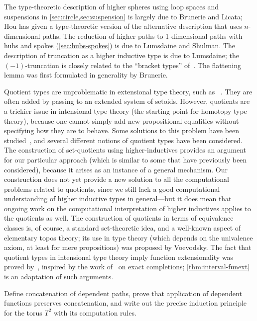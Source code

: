 The type-theoretic description of higher spheres using loop spaces and suspensions in \cref{sec:circle,sec:suspension} is largely due to  Brunerie and  Licata; Hou has given a type-theoretic version of the alternative description that uses $n$-dimensional paths.
The reduction of higher paths to 1-dimensional paths with hubs and spokes (\cref{sec:hubs-spokes}) is due to  Lumsdaine and  Shulman.
The description of truncation as a higher inductive type is due to  Lumsdaine; the $(-1)$-truncation is closely related to the ``bracket types'' of~\cite{ab:bracket-types}.
The flattening lemma was first formulated in generality by  Brunerie.

Quotient types are unproblematic in extensional type theory, such as \NuPRL~\cite{constable+86nuprl-book}.
They are often added by passing to an extended system of setoids.
However, quotients are a trickier issue in intensional type theory (the starting point for homotopy type theory), because one cannot simply add new propositional equalities without specifying how they are to behave. Some solutions to this problem have been studied~\cite{hofmann:thesis,Altenkirch1999,altenkirch+07ott}, and several different notions of quotient types have been considered.  The construction of set-quotients using higher-inductives provides an argument for our particular approach (which is similar to some that have previously been considered), because it arises as an instance of a general mechanism.  Our construction does not yet provide a new solution to all the computational problems related to quotients, since we still lack a good computational understanding of higher inductive types in general---but it does mean that ongoing work on the computational interpretation of higher inductives applies to the quotients as well.  The construction of quotients in terms of equivalence classes is, of
course, a standard set-theoretic idea, and a well-known aspect of elementary topos theory; its use in type theory (which depends on the univalence axiom, at least for mere propositions) was proposed by Voevodsky.  The fact that quotient types in intensional type theory imply function extensionality was proved by~\cite{hofmann:thesis}, inspired by the work of~\cite{carboni} on exact completions; \cref{thm:interval-funext} is an adaptation of such arguments.

\sectionExercises

\begin{ex}\label{ex:torus}
  Define concatenation of dependent paths, prove that application of dependent functions preserves concatenation, and write out the precise induction principle for the torus $T^2$ with its computation rules.
\end{ex}

